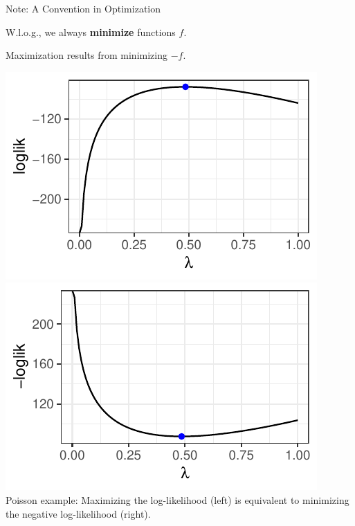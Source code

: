 
\begin{vbframe}{Note: A Convention in Optimization}

W.l.o.g., we always \textbf{minimize} functions $f$. 

\lz

Maximization results from minimizing $-f$.

\begin{center}
	\begin{footnotesize}
	\includegraphics[height=0.3\textwidth, keepaspectratio]{figure_man/ml_poisson_example_2.pdf} \includegraphics[height=0.3\textwidth, keepaspectratio]{figure_man/ml_poisson_example_3.pdf} \\
	Poisson example: Maximizing the log-likelihood (left) is equivalent to minimizing the negative log-likelihood (right). 
	\end{footnotesize}
\end{center}

\end{vbframe}


